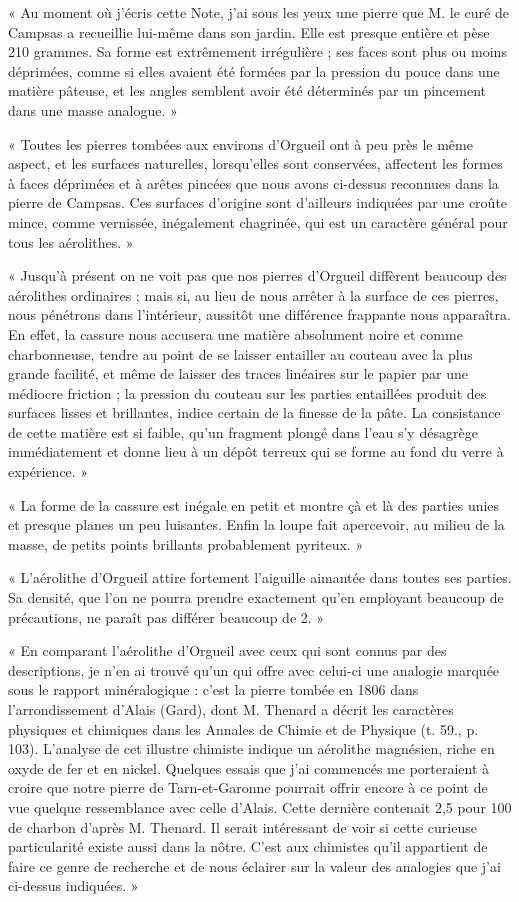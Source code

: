 \documentclass[a4paper, 11pt, oneside, polutonikogreek, french]{article}
\begin{document}
« Au moment où j'écris cette Note, j'ai sous les yeux une pierre que M. le curé de Campsas a recueillie lui-même dans son jardin. Elle est presque entière et pèse 210 grammes. Sa forme est extrêmement irrégulière ; ses faces sont plus ou moins déprimées, comme si elles avaient été formées par la pression du pouce dans une matière pâteuse, et les angles semblent avoir été déterminés par un pincement dans une masse analogue. »

« Toutes les pierres tombées aux environs d'Orgueil ont à peu près le même aspect, et les surfaces naturelles, lorsqu'elles sont conservées, affectent les formes à faces déprimées et à arêtes pincées que nous avons ci-dessus reconnues dans la pierre de Campsas. Ces surfaces d'origine sont d'ailleurs indiquées par une croûte mince, comme vernissée, inégalement chagrinée, qui est un caractère général pour tous les aérolithes. »

« Jusqu'à présent on ne voit pas que nos pierres d'Orgueil diffèrent beaucoup des aérolithes ordinaires ; mais si, au lieu de nous arrêter à la surface de ces pierres, nous pénétrons dans l'intérieur, aussitôt une différence frappante nous apparaîtra. En effet, la cassure nous accusera une matière absolument noire et comme charbonneuse, tendre au point de se laisser entailler au couteau avec la plus grande facilité, et même de laisser des traces linéaires sur le papier par une médiocre friction ; la pression du couteau sur les parties entaillées produit des surfaces lisses et brillantes, indice certain de la finesse de la pâte. La consistance de cette matière est si faible, qu'un fragment plongé dans l'eau s'y désagrège immédiatement et donne lieu à un dépôt terreux qui se forme au fond du verre à expérience. »

« La forme de la cassure est inégale en petit et montre çà et là des parties unies et presque planes un peu luisantes. Enfin la loupe fait apercevoir, au milieu de la masse, de petits points brillants probablement pyriteux. »

« L'aérolithe d'Orgueil attire fortement l'aiguille aimantée dans toutes ses parties. Sa densité, que l'on ne pourra prendre exactement qu'en employant beaucoup de précautions, ne paraît pas différer beaucoup de 2. »

« En comparant l'aérolithe d'Orgueil avec ceux qui sont connus par des descriptions, je n'en ai trouvé qu'un qui offre avec celui-ci une analogie marquée sous le rapport minéralogique : c'est la pierre tombée en 1806 dans l'arrondissement d'Alais (Gard), dont M. Thenard a décrit les caractères physiques et chimiques dans les Annales de Chimie et de Physique (t. 59., p. 103). L'analyse de cet illustre chimiste indique un aérolithe magnésien, riche en oxyde de fer et en nickel. Quelques essais que j'ai commencés me porteraient à croire que notre pierre de Tarn-et-Garonne pourrait offrir encore à ce point de vue quelque ressemblance avec celle d'Alais. Cette dernière contenait 2,5 pour 100 de charbon d'après M. Thenard. Il serait intéressant de voir si cette curieuse particularité existe aussi dans la nôtre. C'est aux chimistes qu'il appartient de faire ce genre de recherche et de nous éclairer sur la valeur des analogies que j'ai ci-dessus indiquées. »
\clearpage
\end{document}
